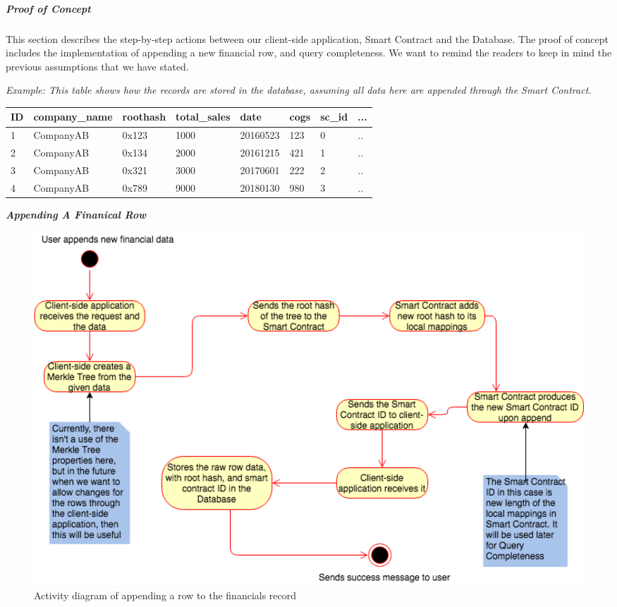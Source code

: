 \subparagraph{Proof of Concept}

This section describes the step-by-step actions between our client-side application, Smart Contract and the Database. The proof of concept includes the implementation of appending a new financial row, and query completeness. We want to remind the readers to keep in mind the previous assumptions that we have stated.


\textit{Example: This table shows how the records are stored in the database, assuming all data here are appended through the Smart Contract.}
\begin{center}
    \begin{tabular}{| l | l | l | l | l | l | l | l |}
    \hline
    ID & company\_name & roothash & total\_sales & date & cogs & sc\_id & ... \\ \hline
    1 & CompanyAB & 0x123 & 1000 & 20160523 & 123 & 0 & .. \\ \hline
    2 & CompanyAB & 0x134 & 2000 & 20161215 & 421 & 1 & .. \\ \hline
    3 & CompanyAB & 0x321 & 3000 & 20170601 & 222 & 2 & .. \\ \hline
    4 & CompanyAB & 0x789 & 9000 & 20180130 & 980 & 3 & .. \\ \hline
    \end{tabular}
\end{center}



\textbf{\textit{Appending A Finanical Row}}

\begin{figure}[h]%
\centering
\includegraphics[width=1.0\textwidth]{images/appendRowFinancials.png}
\caption{\label{fig:appendRowFinancials}Activity diagram of appending a row to the financials record}
\end{figure}

